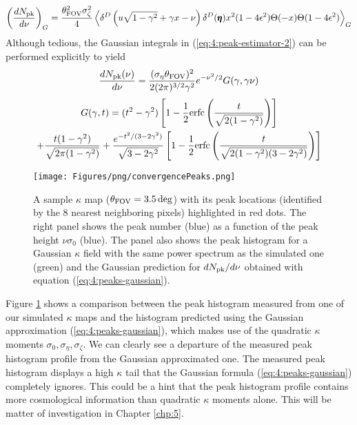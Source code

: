 \begin{equation}
\label{eq:4:peak-estimator-2}
\left(\frac{dN_{\rm pk}}{d\nu}\right)_G = \frac{\theta^2_{\rm FOV}\sigma^2_\zeta}{4}\left\langle\delta^D\left(u\sqrt{1-\gamma^2}+\gamma x-\nu\right)\delta^D(\pmb{\eta})x^2(1-4\epsilon^2)\Theta(-x)\Theta(1-4\epsilon^2)\right\rangle_G
\end{equation}
%
Although tedious, the Gaussian integrals in (\ref{eq:4:peak-estimator-2}) can be performed explicitly \citep{BondCMB} to yield
%
\begin{equation}
\label{eq:4:peaks-gaussian}
\frac{dN_{\rm pk}(\nu)}{d\nu} = \frac{(\sigma_\eta\theta_{\rm FOV})^2}{2(2\pi)^{3/2} \gamma^2}e^{-\nu^2/2}G(\gamma,\gamma\nu)
\end{equation}
%
\begin{equation}
\label{eq:4:Gdef}
\begin{gathered}
G(\gamma,t) = (t^2-\gamma^2)\left[1-\frac{1}{2}{\rm erfc}\left(\frac{t}{\sqrt{2(1-\gamma^2)}}\right)\right] \\
+ \frac{t(1-\gamma^2)}{\sqrt{2\pi(1-\gamma^2)}} + \frac{e^{-t^2/(3-2\gamma^2)}}{\sqrt{3-2\gamma^2}}\left[1-\frac{1}{2}{\rm erfc}\left(\frac{t}{\sqrt{2(1-\gamma^2)(3-2\gamma^2)}}\right)\right]
\end{gathered}
\end{equation}
%
\begin{figure}
\begin{center}
\texttt{[image: Figures/png/convergencePeaks.png]}
\end{center}
\caption{A sample $\kappa$ map ($\theta_{\rm FOV}=3.5\,{\rm deg}$) with its peak locations (identified by the 8 nearest neighboring pixels) highlighted in red dots. The right panel shows the peak number (blue) as a function of the peak height $\nu\sigma_0$ (blue). The panel also shows the peak histogram for a Gaussian $\kappa$ field with the same power spectrum as the simulated one (green) and the Gaussian prediction for $dN_{\rm pk}/d\nu$ obtained with equation (\ref{eq:4:peaks-gaussian}).}
\label{fig:4:peaks}
\end{figure}
%
Figure \ref{fig:4:peaks} shows a comparison between the peak histogram measured from one of our simulated $\kappa$ maps and the histogram predicted using the Gaussian approximation (\ref{eq:4:peaks-gaussian}), which makes use of the quadratic $\kappa$ moments $\sigma_0,\sigma_\eta,\sigma_\zeta$. We can clearly see a departure of the measured peak histogram profile from the Gaussian approximated one. The measured peak histogram displays a high $\kappa$ tail that the Gaussian formula (\ref{eq:4:peaks-gaussian}) completely ignores. This could be a hint that the peak histogram profile contains more cosmological information than quadratic $\kappa$ moments alone. This will be matter of investigation in Chapter \ref{chp:5}.    

